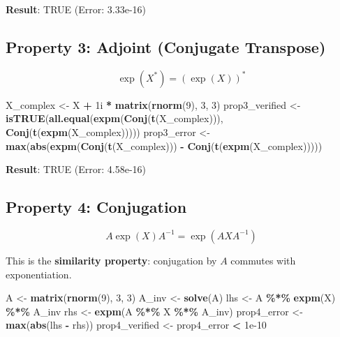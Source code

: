 \documentclass[
]{book}
\newenvironment{Shaded}{\begin{snugshade}}{\end{snugshade}}
\newcommand{\DataTypeTok}[1]{\textcolor[rgb]{0.13,0.29,0.53}{#1}}
\newcommand{\DecValTok}[1]{\textcolor[rgb]{0.00,0.00,0.81}{#1}}
\newcommand{\FloatTok}[1]{\textcolor[rgb]{0.00,0.00,0.81}{#1}}
\newcommand{\FunctionTok}[1]{\textcolor[rgb]{0.13,0.29,0.53}{\textbf{#1}}}
\newcommand{\NormalTok}[1]{#1}
\newcommand{\OtherTok}[1]{\textcolor[rgb]{0.56,0.35,0.01}{#1}}
\newcommand{\SpecialCharTok}[1]{\textcolor[rgb]{0.81,0.36,0.00}{\textbf{#1}}}
\theoremstyle{definition}
\theoremstyle{definition}
\theoremstyle{definition}
\theoremstyle{definition}
\theoremstyle{remark}
\begin{document}
\textbf{Result}: TRUE (Error: 3.33e-16)

\subsection{Property 3: Adjoint (Conjugate Transpose)}\label{property-3-adjoint-conjugate-transpose}

\[\exp(X^*) = (\exp(X))^*\]

\begin{Shaded}
\begin{Highlighting}[]
\NormalTok{X\_complex }\OtherTok{\textless{}{-}}\NormalTok{ X }\SpecialCharTok{+} \DecValTok{1}\DataTypeTok{i} \SpecialCharTok{*} \FunctionTok{matrix}\NormalTok{(}\FunctionTok{rnorm}\NormalTok{(}\DecValTok{9}\NormalTok{), }\DecValTok{3}\NormalTok{, }\DecValTok{3}\NormalTok{)}
\NormalTok{prop3\_verified }\OtherTok{\textless{}{-}} \FunctionTok{isTRUE}\NormalTok{(}\FunctionTok{all.equal}\NormalTok{(}\FunctionTok{expm}\NormalTok{(}\FunctionTok{Conj}\NormalTok{(}\FunctionTok{t}\NormalTok{(X\_complex))), }\FunctionTok{Conj}\NormalTok{(}\FunctionTok{t}\NormalTok{(}\FunctionTok{expm}\NormalTok{(X\_complex)))))}
\NormalTok{prop3\_error }\OtherTok{\textless{}{-}} \FunctionTok{max}\NormalTok{(}\FunctionTok{abs}\NormalTok{(}\FunctionTok{expm}\NormalTok{(}\FunctionTok{Conj}\NormalTok{(}\FunctionTok{t}\NormalTok{(X\_complex))) }\SpecialCharTok{{-}} \FunctionTok{Conj}\NormalTok{(}\FunctionTok{t}\NormalTok{(}\FunctionTok{expm}\NormalTok{(X\_complex)))))}
\end{Highlighting}
\end{Shaded}

\textbf{Result}: TRUE (Error: 4.58e-16)

\subsection{Property 4: Conjugation}\label{property-4-conjugation}

\[A \exp(X) A^{-1} = \exp(AXA^{-1})\]

This is the \textbf{similarity property}: conjugation by \(A\) commutes with exponentiation.

\begin{Shaded}
\begin{Highlighting}[]
\NormalTok{A }\OtherTok{\textless{}{-}} \FunctionTok{matrix}\NormalTok{(}\FunctionTok{rnorm}\NormalTok{(}\DecValTok{9}\NormalTok{), }\DecValTok{3}\NormalTok{, }\DecValTok{3}\NormalTok{)}
\NormalTok{A\_inv }\OtherTok{\textless{}{-}} \FunctionTok{solve}\NormalTok{(A)}
\NormalTok{lhs }\OtherTok{\textless{}{-}}\NormalTok{ A }\SpecialCharTok{\%*\%} \FunctionTok{expm}\NormalTok{(X) }\SpecialCharTok{\%*\%}\NormalTok{ A\_inv}
\NormalTok{rhs }\OtherTok{\textless{}{-}} \FunctionTok{expm}\NormalTok{(A }\SpecialCharTok{\%*\%}\NormalTok{ X }\SpecialCharTok{\%*\%}\NormalTok{ A\_inv)}
\NormalTok{prop4\_error }\OtherTok{\textless{}{-}} \FunctionTok{max}\NormalTok{(}\FunctionTok{abs}\NormalTok{(lhs }\SpecialCharTok{{-}}\NormalTok{ rhs))}
\NormalTok{prop4\_verified }\OtherTok{\textless{}{-}}\NormalTok{ prop4\_error }\SpecialCharTok{\textless{}} \FloatTok{1e{-}10}
\end{Highlighting}
\end{Shaded}
\end{document}
